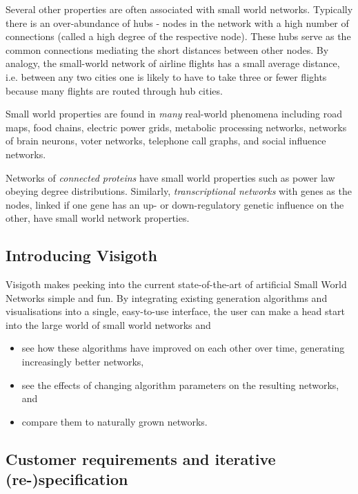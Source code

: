 \documentclass[a4paper,11pt,titlepage]{article}
\begin{document}
Several other properties are often associated with small world
networks. Typically there is an over-abundance of hubs - nodes
in the network with a high number of connections (called a high
degree of the respective node). These hubs serve as the common
connections mediating the short distances between other
nodes. By analogy, the small-world network of airline flights
has a small average distance, i.e. between any two cities one
is likely to have to take three or fewer flights because many
flights are routed through hub cities. \cite{smnet}

Small world properties are found in \emph{many} real-world
phenomena including road maps, food chains, electric power
grids, metabolic processing networks, networks of brain
neurons, voter networks, telephone call graphs, and social
influence networks.

Networks of \emph{connected proteins} have small world properties
such as power law obeying degree distributions. Similarly,
\emph{transcriptional networks} with genes as the nodes,
linked if one gene has an up- or down-regulatory genetic
influence on the other, have small world network properties.



\subsection{Introducing Visigoth}

Visigoth makes peeking into the current state-of-the-art of artificial Small
World Networks simple and fun. By integrating existing generation algorithms and
visualisations into a single, easy-to-use interface, the user can make a head
start into the large world of small world networks and

\begin{itemize}
  \item see how these algorithms have improved on each other over time,
    generating increasingly better networks,
  \item see the effects of changing algorithm parameters on the
    resulting networks, and
  \item compare them to naturally grown networks.
\end{itemize}

\subsection{Customer requirements and iterative (re-)specification}
\end{document}
